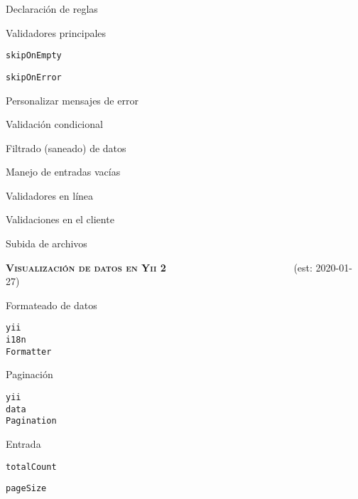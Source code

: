 \begin{longenum}
\begin{longenum}
        \begin{longenum}
            \item Declaración de reglas
            \begin{longenum}
                \item Validadores principales
                \item \texttt{skipOnEmpty}
                \item \texttt{skipOnError}
                \item Personalizar mensajes de error
                \item Validación condicional
                \item Filtrado (saneado) de datos
                \item Manejo de entradas vacías
            \end{longenum}
            \item Validadores en línea
            \item Validaciones en el cliente \opcional\
        \end{longenum}
        \item Subida de archivos
    \end{longenum}
    \item \textbf{\textsc{Visualización de datos en Yii 2}} \ \ \ \ \ \ \ \ \ \ \ \ \ \ \ \ \ \ \ \ \ \ \ \ \ (est: \mbox{2020-01-27})
    \begin{longenum}
        \item Formateado de datos
        \begin{longenum}
            \item \texttt{yii\\i18n\\Formatter}
        \end{longenum}
        \item Paginación
        \begin{longenum}
            \item \texttt{yii\\data\\Pagination}
            \item Entrada
            \begin{longenum}
                \item \texttt{totalCount}
                \item \texttt{pageSize}

\end{longenum}
\end{longenum}
\end{longenum}
\end{longenum}
